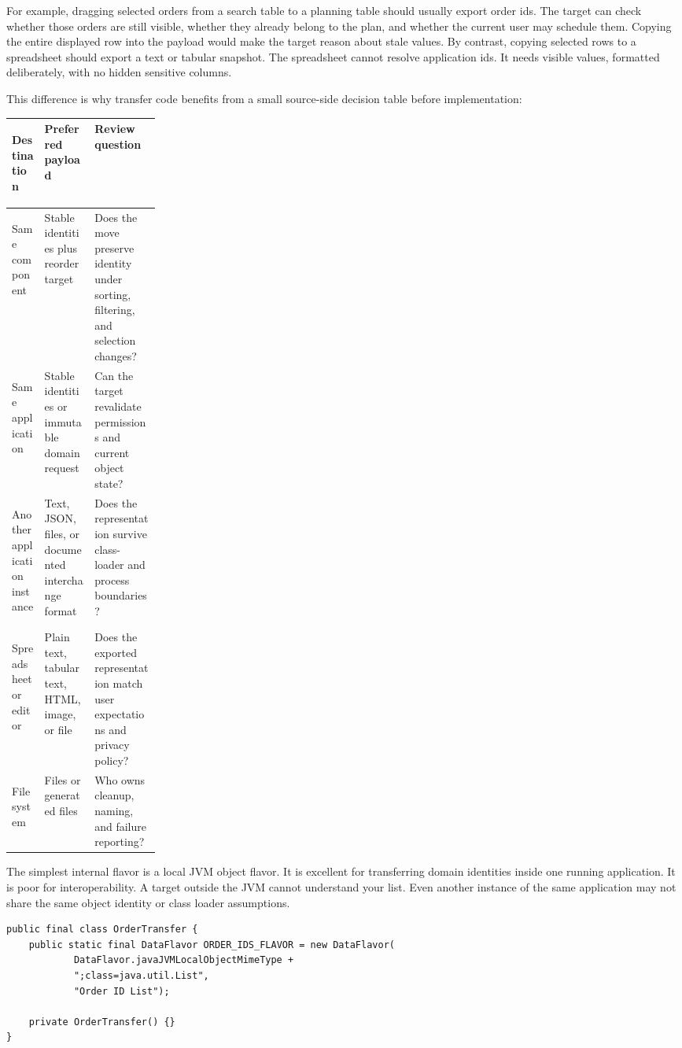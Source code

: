 For example, dragging selected orders from a search table to a planning table should usually export order ids. The target can check whether those orders are still visible, whether they already belong to the plan, and whether the current user may schedule them. Copying the entire displayed row into the payload would make the target reason about stale values. By contrast, copying selected rows to a spreadsheet should export a text or tabular snapshot. The spreadsheet cannot resolve application ids. It needs visible values, formatted deliberately, with no hidden sensitive columns.

This difference is why transfer code benefits from a small source-side decision table before implementation:

\begin{center}\small
\begin{tabularx}{0.96\linewidth}{>{\bfseries\raggedright\arraybackslash}p{0.22\linewidth}X X}
\toprule
Destination & Preferred payload & Review question\\
\midrule
Same component & Stable identities plus reorder target & Does the move preserve identity under sorting, filtering, and selection changes?\\
Same application & Stable identities or immutable domain request & Can the target revalidate permissions and current object state?\\
Another application instance & Text, JSON, files, or documented interchange format & Does the representation survive class-loader and process boundaries?\\
Spreadsheet or editor & Plain text, tabular text, HTML, image, or file & Does the exported representation match user expectations and privacy policy?\\
File system & Files or generated files & Who owns cleanup, naming, and failure reporting?\\
\bottomrule
\end{tabularx}
\end{center}

The simplest internal flavor is a local JVM object flavor. It is excellent for transferring domain identities inside one running application. It is poor for interoperability. A target outside the JVM cannot understand your  list. Even another instance of the same application may not share the same object identity or class loader assumptions.

\begin{lstlisting}[caption={Defining a local DataFlavor for domain row identities.}]
public final class OrderTransfer {
    public static final DataFlavor ORDER_IDS_FLAVOR = new DataFlavor(
            DataFlavor.javaJVMLocalObjectMimeType +
            ";class=java.util.List",
            "Order ID List");

    private OrderTransfer() {}
}
\end{lstlisting}


